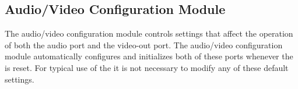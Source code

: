 \subsection{Audio/Video Configuration Module}

The audio/video configuration module controls settings that affect the operation
of both the audio port and the video-out port. The audio/video configuration module
automatically configures and initializes both of these ports whenever the
{\it \systemNameFull} is reset. For typical use of the {\it \systemNameFull} it is not necessary
to modify any of these default settings. 


